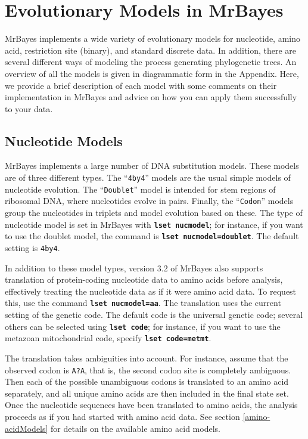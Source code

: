 \documentclass[12pt]{book}
\newcommand{\ttt}[1]{\texttt{#1}}
\newcommand{\tb}[1]{\ttt{\textbf{#1}}}
\begin{document}
\chapter{Evolutionary Models in MrBayes}
\label{evolutionaryModels}

MrBayes implements a wide variety of evolutionary models for nucleotide, amino acid, restriction
site (binary), and standard discrete data. In addition, there are several different ways of
modeling the process generating phylogenetic trees. An overview of all the models is given in
diagrammatic form in the Appendix. Here, we provide a brief description of each model with some
comments on their implementation in MrBayes and advice on how you can apply them successfully to
your data.

\section{Nucleotide Models}
MrBayes implements a large number of DNA substitution models. These models are of three different
types. The ``\ttt{4by4}'' models are the usual simple models of nucleotide evolution. The
``\ttt{Doublet}'' model is intended for stem regions of ribosomal DNA, where nucleotides evolve in
pairs. Finally, the ``\ttt{Codon}'' models group the nucleotides in triplets and model evolution
based on these. The type of nucleotide model is set in MrBayes with \tb{lset nucmodel}; for
instance, if you want to use the doublet model, the command is \tb{lset nucmodel=doublet}. The
default setting is \ttt{4by4}.

In addition to these model types, version 3.2 of MrBayes also supports translation of
protein-coding nucleotide data to amino acids before analysis, effectively treating the nucleotide
data as if it were amino acid data. To request this, use the command \tb{lset nucmodel=aa}. The
translation uses the current setting of the genetic code. The default code is the universal genetic
code; several others can be selected using \tb{lset code}; for instance, if you want to use the
metazoan mitochondrial code, specify \tb{lset code=metmt}.

The translation takes ambiguities into account. For instance, assume that the observed codon is
\ttt{A?A}, that is, the second codon site is completely ambiguous. Then each of the possible
unambiguous codons is translated to an amino acid separately, and all unique amino acids are then
included in the final state set. Once the nucleotide sequences have been translated to amino acids,
the analysis proceeds as if you had started with amino acid data. See section
\ref{amino-acidModels} for details on the available amino acid models.
\end{document}
